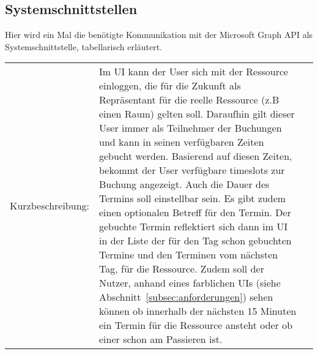 \subsection{Systemschnittstellen}\label{subsec:systemschnittstellen}
Hier wird ein Mal die benötigte Kommunikation mit der Microsoft Graph API als Systemschnittstelle, tabellarisch erläutert.
\newline
\newline
\begin{tabularx}{\textwidth\footnotesize}{|l*{2}{|X}|} \hline
    \caption{Termin buchen}
    \label{tab:TerminBuchen}
 Kurzbeschreibung: & Im UI kann der User sich mit der Ressource einloggen, die für die Zukunft als Repräsentant für die reelle Ressource (z.B einen Raum) gelten soll.
    Daraufhin gilt dieser User immer als Teilnehmer der Buchungen und kann in seinen verfügbaren Zeiten gebucht werden.
    Basierend auf diesen Zeiten, bekommt der User verfügbare timeslots zur Buchung angezeigt.
    Auch die Dauer des Termins soll einstellbar sein.
    Es gibt zudem einen optionalen Betreff für den Termin.
    Der gebuchte Termin reflektiert sich dann im UI in der Liste der für den Tag schon gebuchten Termine und den Terminen vom nächsten Tag, für die Ressource.
    Zudem soll der Nutzer, anhand eines farblichen UIs (siehe Abschnitt~\ref{subsec:anforderungen}) sehen können ob innerhalb der nächsten 15 Minuten ein Termin für die Ressource ansteht oder ob einer schon am Passieren ist.


\end{tabularx}
